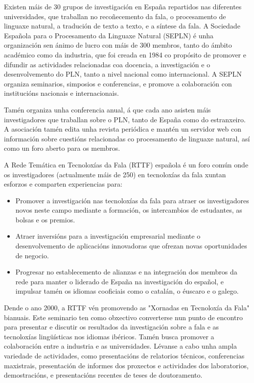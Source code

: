 \begin{multicols}{2}
Existen máis de 30 grupos de investigación en España repartidos nas diferentes universidades, que traballan no recoñecemento da fala, o procesamento de linguaxe natural, a tradución de texto a texto, e a síntese da fala. A Sociedade Española para o Procesamento da Linguaxe Natural (SEPLN) é unha organización sen ánimo de lucro con máis de 300 membros, tanto do ámbito académico como da industria, que foi creada en 1984 co propósito de promover e difundir as actividades relacionadas coa docencia, a investigación e o desenvolvemento do PLN, tanto a nivel nacional como internacional. A SEPLN organiza seminarios, simposios e conferencias, e promove a colaboración con institucións nacionais e internacionais.

Tamén organiza unha conferencia anual, á que cada ano asisten máis investigadores que traballan sobre o PLN, tanto de España como do estranxeiro. A asociación tamén edita unha revista periódica e mantén un servidor web con información sobre cuestións relacionadas co procesamento de linguaxe natural, así como un foro aberto para os membros.

A Rede Temática en Tecnoloxías da Fala (RTTF) española \cite{GAL-Nota34} é un foro común onde os investigadores (actualmente máis de 250) en tecnoloxías da fala xuntan esforzos e comparten experiencias para:
	\begin{itemize}
		\item Promover a investigación nas tecnoloxías da fala para atraer os investigadores novos neste campo mediante a formación, os intercambios de estudantes, as bolsas e os premios.
		\item Atraer inversións para a investigación empresarial mediante o desenvolvemento de aplicacións innovadoras que ofrezan novas oportunidades de negocio. 
		\item Progresar no establecemento de alianzas e na integración dos membros da rede para manter o liderado de España na investigación do español, e impulsar tamén os idiomas cooficiais como o catalán, o éuscaro e o galego.
	\end{itemize}

Dende o ano 2000, a RTTF vén promovendo as "Xornadas en Tecnoloxía da Fala" bianuais. Este seminario ten como obxectivo converterse nun punto de encontro para presentar e discutir os resultados da investigación sobre a fala e as tecnoloxías lingüísticas nos idiomas ibéricos. Tamén busca promover a colaboración entre a industria e as universidades. Lévanse a cabo unha ampla variedade de actividades, como presentacións de relatorios técnicos, conferencias maxistrais, presentación de informes dos proxectos e actividades dos laboratorios, demostracións, e presentacións recentes de teses de doutoramento.


\end{multicols}
